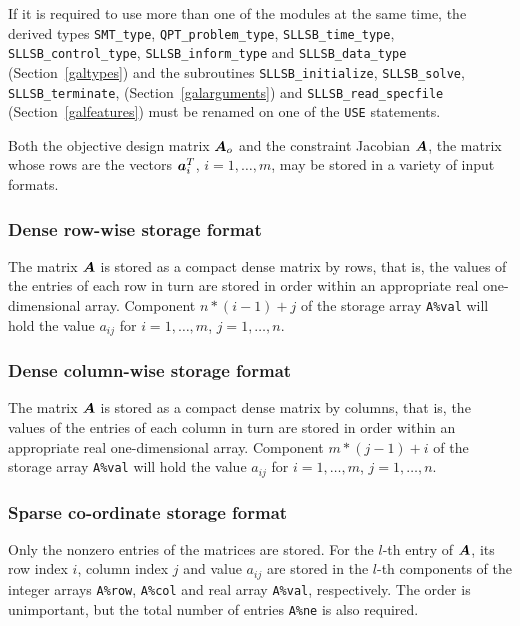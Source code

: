 \documentclass{galahad}
\newcommand{\packagename}{SLLSB}
\begin{document}


\noindent
If it is required to use more than one of the modules at the same time, 
the derived types
{\tt SMT\_type},
{\tt QPT\_problem\_type},
{\tt \packagename\_time\_type},
{\tt \packagename\_control\_type},
{\tt \packagename\_inform\_type}
and
{\tt \packagename\_data\_type}
(Section~\ref{galtypes})
and the subroutines
{\tt \packagename\_initialize},
{\tt \packagename\_\-solve},
{\tt \packagename\_terminate},
(Section~\ref{galarguments})
and
{\tt \packagename\_read\_specfile}
(Section~\ref{galfeatures})
must be renamed on one of the {\tt USE} statements.


\galmatrix
Both the objective design matrix ${\bm{A}}_o$ and
the constraint Jacobian ${\bm{A}}$, the matrix
whose rows are the vectors ${\bm{a}}_{i}^{T}$, $i = 1, \ldots , m$,
may be stored in a variety of input formats.

\subsubsection{Dense row-wise storage format}\label{dense}
The matrix ${\bm{A}}$ is stored as a compact
dense matrix by rows, that is, the values of the entries of each row in turn are
stored in order within an appropriate real one-dimensional array.
Component $n \ast (i-1) + j$ of the storage array {\tt A\%val} will hold the
value $a_{ij}$ for $i = 1, \ldots , m$, $j = 1, \ldots , n$.

\subsubsection{Dense column-wise storage format}\label{densecolumnwise}
The matrix ${\bm{A}}$ is stored as a compact
dense matrix by columns, that is, the values of the entries of each column
in turn are stored in order within an appropriate real one-dimensional array.
Component $m \ast (j-1) + i$ of the storage array {\tt A\%val} will hold the
value $a_{ij}$ for $i = 1, \ldots , m$, $j = 1, \ldots , n$.

\subsubsection{Sparse co-ordinate storage format}\label{coordinate}
Only the nonzero entries of the matrices are stored. For the
$l$-th entry of ${\bm{A}}$, its row index $i$, column index $j$
and value $a_{ij}$
are stored in the $l$-th components of the integer arrays {\tt A\%row},
{\tt A\%col} and real array {\tt A\%val}, respectively.
The order is unimportant, but the total
number of entries {\tt A\%ne} is also required.
\end{document}
